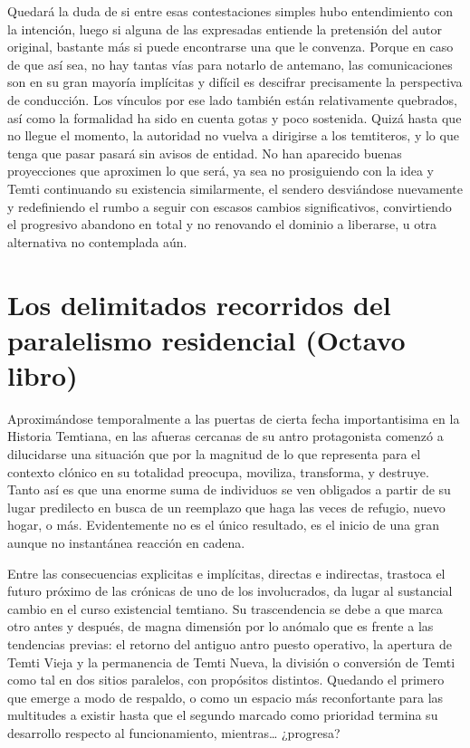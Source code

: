 \documentclass[
]{book}
\begin{document}
Quedará la duda de si entre esas contestaciones simples hubo entendimiento con la intención, luego si alguna de las expresadas entiende la pretensión del autor original, bastante más si puede encontrarse una que le convenza. Porque en caso de que así sea, no hay tantas vías para notarlo de antemano, las comunicaciones son en su gran mayoría implícitas y difícil es descifrar precisamente la perspectiva de conducción. Los vínculos por ese lado también están relativamente quebrados, así como la formalidad ha sido en cuenta gotas y poco sostenida. Quizá hasta que no llegue el momento, la autoridad no vuelva a dirigirse a los temtiteros, y lo que tenga que pasar pasará sin avisos de entidad. No han aparecido buenas proyecciones que aproximen lo que será, ya sea no prosiguiendo con la idea y Temti continuando su existencia similarmente, el sendero desviándose nuevamente y redefiniendo el rumbo a seguir con escasos cambios significativos, convirtiendo el progresivo abandono en total y no renovando el dominio a liberarse, u otra alternativa no contemplada aún.

\hypertarget{los-delimitados-recorridos-del-paralelismo-residencial-octavo-libro}{%
\chapter{Los delimitados recorridos del paralelismo residencial (Octavo libro)}\label{los-delimitados-recorridos-del-paralelismo-residencial-octavo-libro}}

Aproximándose temporalmente a las puertas de cierta fecha importantisima en la Historia Temtiana, en las afueras cercanas de su antro protagonista comenzó a dilucidarse una situación que por la magnitud de lo que representa para el contexto clónico en su totalidad preocupa, moviliza, transforma, y destruye. Tanto así es que una enorme suma de individuos se ven obligados a partir de su lugar predilecto en busca de un reemplazo que haga las veces de refugio, nuevo hogar, o más. Evidentemente no es el único resultado, es el inicio de una gran aunque no instantánea reacción en cadena.

Entre las consecuencias explicitas e implícitas, directas e indirectas, trastoca el futuro próximo de las crónicas de uno de los involucrados, da lugar al sustancial cambio en el curso existencial temtiano. Su trascendencia se debe a que marca otro antes y después, de magna dimensión por lo anómalo que es frente a las tendencias previas: el retorno del antiguo antro puesto operativo, la apertura de Temti Vieja y la permanencia de Temti Nueva, la división o conversión de Temti como tal en dos sitios paralelos, con propósitos distintos. Quedando el primero que emerge a modo de respaldo, o como un espacio más reconfortante para las multitudes a existir hasta que el segundo marcado como prioridad termina su desarrollo respecto al funcionamiento, mientras\ldots{} ¿progresa?
\end{document}
